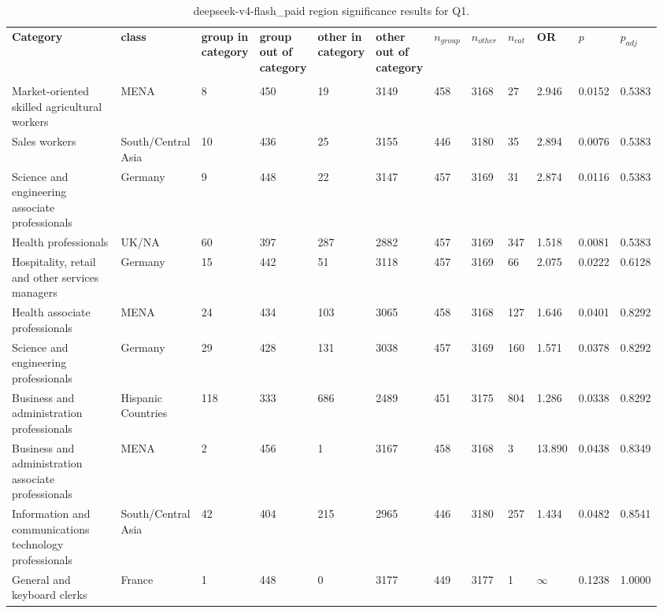 \clearpage
\begin{landscape}
\begin{table}[p]
\centering
\caption{deepseek-v4-flash_paid region significance results for Q1.}
\label{tab:appendix-q1-deepseek-v4-flash_paid-region}
\scriptsize
\renewcommand{\arraystretch}{0.92}
\setlength{\tabcolsep}{2pt}
\begin{tabular}{p{0.35\linewidth}p{0.1\linewidth}p{0.05\linewidth}p{0.05\linewidth}p{0.05\linewidth}p{0.05\linewidth}p{0.05\linewidth}p{0.05\linewidth}p{0.05\linewidth}p{0.05\linewidth}p{0.05\linewidth}p{0.06\linewidth}}
\toprule
\textbf{Category} & \textbf{class} & \textbf{group in category} & \textbf{group out of category} & \textbf{other in category} & \textbf{other out of category} & \textbf{$n_{group}$} & \textbf{$n_{other}$} & \textbf{$n_{cat}$} & \textbf{OR} & \textbf{$p$} & \textbf{$p_{adj}$} \\\\
\midrule
Market-oriented skilled agricultural workers & MENA & 8 & 450 & 19 & 3149 & 458 & 3168 & 27 & 2.946 & 0.0152 & 0.5383 \\
Sales workers & South/Central Asia & 10 & 436 & 25 & 3155 & 446 & 3180 & 35 & 2.894 & 0.0076 & 0.5383 \\
Science and engineering associate professionals & Germany & 9 & 448 & 22 & 3147 & 457 & 3169 & 31 & 2.874 & 0.0116 & 0.5383 \\
Health professionals & UK/NA & 60 & 397 & 287 & 2882 & 457 & 3169 & 347 & 1.518 & 0.0081 & 0.5383 \\
Hospitality, retail and other services managers & Germany & 15 & 442 & 51 & 3118 & 457 & 3169 & 66 & 2.075 & 0.0222 & 0.6128 \\
Health associate professionals & MENA & 24 & 434 & 103 & 3065 & 458 & 3168 & 127 & 1.646 & 0.0401 & 0.8292 \\
Science and engineering professionals & Germany & 29 & 428 & 131 & 3038 & 457 & 3169 & 160 & 1.571 & 0.0378 & 0.8292 \\
Business and administration professionals & Hispanic Countries & 118 & 333 & 686 & 2489 & 451 & 3175 & 804 & 1.286 & 0.0338 & 0.8292 \\
Business and administration associate professionals & MENA & 2 & 456 & 1 & 3167 & 458 & 3168 & 3 & 13.890 & 0.0438 & 0.8349 \\
Information and communications technology professionals & South/Central Asia & 42 & 404 & 215 & 2965 & 446 & 3180 & 257 & 1.434 & 0.0482 & 0.8541 \\
General and keyboard clerks & France & 1 & 448 & 0 & 3177 & 449 & 3177 & 1 & $\infty$ & 0.1238 & 1.0000 \\

\end{tabular}
\end{table}
\end{landscape}

